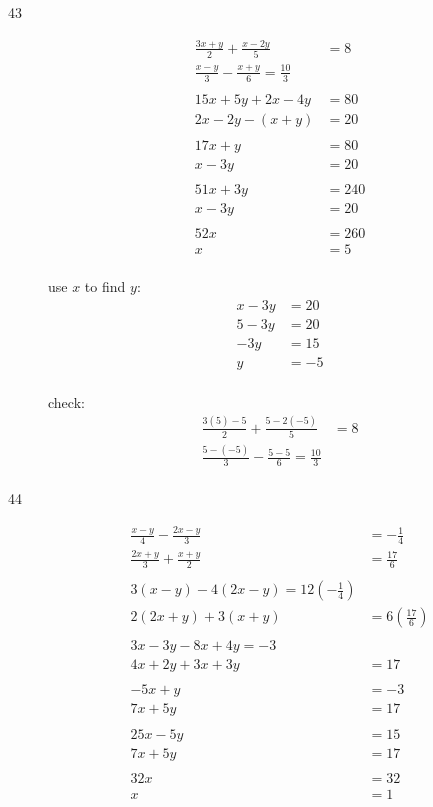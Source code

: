 \documentclass[fleqn,addpoints]{exam}
\begin{document}
\begin{description}
\item[43]
\begin{align*}
  \frac{3x+y}{2} + \frac{x-2y}{5} &= 8 \\
  \frac{x-y}{3} - \frac{x+y}{6} = \frac{10}{3} \\
  \\
  15x + 5y + 2x - 4y &= 80 \\
  2x - 2y - (x+y) &= 20 \\
  \\
  17x + y &= 80 \\
  x - 3y &= 20 \\
  \\
  51x + 3y &= 240 \\
  x - 3y &= 20 \\
  \\
  52x &= 260 \\
  x &= 5 \\
\end{align*}

use $x$ to find $y$:
\begin{align*}
  x - 3y &= 20 \\
  5 - 3y &= 20 \\
  -3y &= 15 \\
  y &= -5 \\
\end{align*}

\vspace{0.2 cm}
\vspace{0.2 cm}

check:
\begin{align*}
  \frac{3(5)-5}{2} + \frac{5-2(-5)}{5} &= 8 \\
  \frac{5-(-5)}{3} - \frac{5-5}{6} = \frac{10}{3} \\
\end{align*}

\item[44]
\begin{align*}
  \frac{x-y}{4} - \frac{2x-y}{3} &= -\frac{1}{4} \\
  \frac{2x+y}{3} + \frac{x+y}{2} &= \frac{17}{6} \\
  \\
  3(x - y) - 4(2x-y) = 12 \left( - \frac{1}{4} \right) \\
  2(2x+y) + 3(x+y) &= 6 \left( \frac{17}{6} \right) \\
  \\
  3x - 3y - 8x + 4y = -3 \\
  4x + 2y + 3x + 3y &= 17 \\
  \\
  -5x + y &= -3 \\
  7x + 5y &= 17 \\
  \\ 
  25x - 5y &= 15 \\
   7x + 5y &= 17 \\
  \\
  32x &= 32 \\
  x &= 1 \\
\end{align*}


\end{description}
\end{document}
